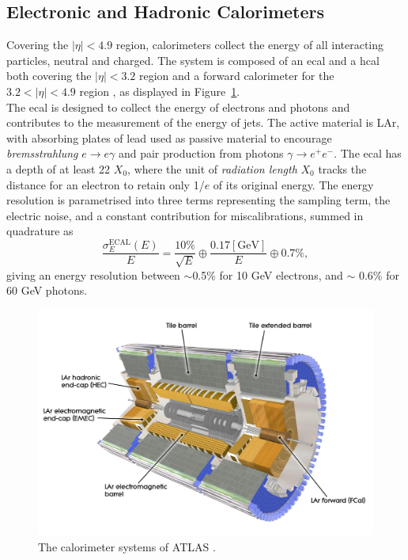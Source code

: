 \subsection{Electronic and Hadronic Calorimeters}
Covering the $|\eta| < 4.9$ region, calorimeters collect the energy of all interacting particles, neutral and charged. The system is composed of an \gls{ecal} and a \gls{hcal} both covering the $|\eta| < 3.2$ region and a forward calorimeter for the $3.2 < |\eta| < 4.9$ region \cite{TheATLASCollaboration_2008}, as displayed in Figure~\ref{fig-AtlasDecCalo}.\\

The \gls{ecal} is designed to collect the energy of electrons and photons and contributes to the measurement of the energy of jets. The active material is LAr, with absorbing plates of lead used as passive material to encourage \textit{bremsstrahlung} $e \rightarrow e\gamma$ and pair production from photons $\gamma \rightarrow e^+e^-$. The \gls{ecal} has a depth of at least 22 $X_0$, where the unit of \textit{radiation length} $X_0$ tracks the distance for an electron to retain only 1/$e$ of its original energy. The energy resolution is parametrised into three terms representing the sampling term, the electric noise, and a constant contribution for miscalibrations, summed in quadrature as \cite{Cavallari_2011}
\begin{equation}
  \frac{\sigma_E^{\text{ECAL}}(E)}{E} = \frac{10\%}{\sqrt{E}} \oplus \frac{0.17 [\text{GeV}]}{E} \oplus 0.7\%,
\end{equation}
giving an energy resolution between $\sim$0.5\% for 10 GeV electrons, and $\sim$ 0.6\% for 60 GeV photons.\\

\begin{figure}[!h]
  \centering
  \includegraphics[width=\textwidth]{Images/ATLAS/ATLASCalo.jpg}
  \caption{The calorimeter systems of ATLAS \cite{ATLASschematics}.}
  \label{fig-AtlasDecCalo}
\end{figure}

